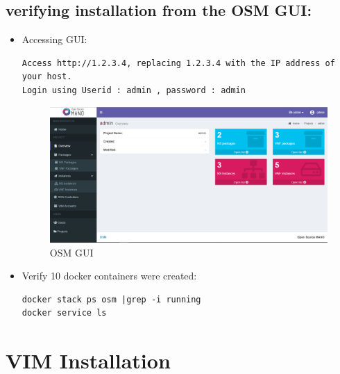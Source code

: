 \subsection{verifying installation from the OSM GUI:}
\begin{itemize}
\item Accessing GUI:
\begin{lstlisting} 
Access http://1.2.3.4, replacing 1.2.3.4 with the IP address of your host.
Login using Userid : admin , password : admin
\end{lstlisting}

\begin{figure} [H]
	\centering
	\includegraphics[width=0.5\linewidth]{figures/Sh1}
	\caption{OSM GUI}
\end{figure}

\item Verify 10 docker containers were created:
\begin{lstlisting} 
docker stack ps osm |grep -i running
docker service ls
\end{lstlisting}
\end{itemize}
\section{VIM Installation}
